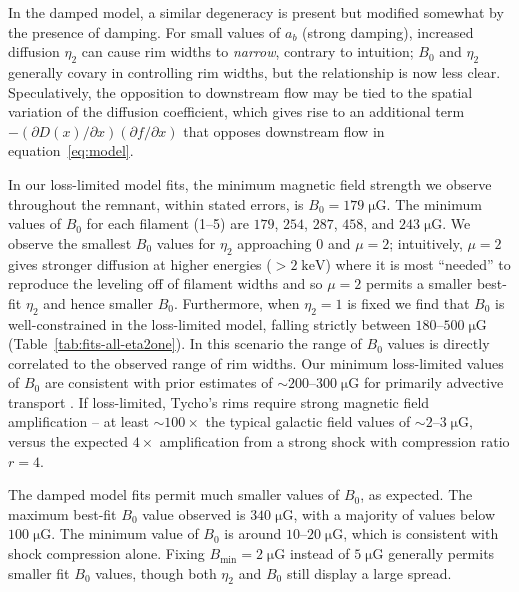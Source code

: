 \documentclass[iop, apj, numberedappendix]{emulateapj}
\newcommand*{\mt}{\mathrm}
\newcommand*{\unit}[1]{\;\mt{#1}}  %
\newcommand*{\abt}{\mathord{\sim}} %
\newcommand*{\ptl}{\partial}
\newcommand*{\Bmin}{B_{\mt{min}}}
\newcommand*{\muG}{\unit{\mu G}}
\begin{document}
In the damped model, a similar degeneracy is present but modified somewhat by
the presence of damping.  For small values of $a_b$ (strong damping), increased
diffusion $\eta_2$ can cause rim widths to \emph{narrow}, contrary to
intuition; $B_0$ and $\eta_2$ generally covary in controlling rim widths, but
the relationship is now less clear.  Speculatively, the opposition to
downstream flow may be tied to the spatial variation of the diffusion
coefficient, which gives rise to an additional term $-(\ptl D(x) / \ptl x)
(\ptl f/\ptl x)$ that opposes downstream flow in equation~\eqref{eq:model}.


In our loss-limited model fits, the minimum magnetic field strength we observe
throughout the remnant, within stated errors, is $B_0 = 179 \muG$.  The minimum
values of $B_0$ for each filament (1--5) are $179$, $254$, $287$, $458$, and
$243 \muG$.  We observe the smallest $B_0$ values for $\eta_2$ approaching $0$
and $\mu = 2$; intuitively, $\mu = 2$ gives stronger diffusion at higher
energies ($>2\unit{keV}$) where it is most ``needed'' to reproduce the leveling
off of filament widths and so $\mu = 2$ permits a smaller best-fit $\eta_2$ and
hence smaller $B_0$.  Furthermore, when $\eta_2 = 1$ is fixed we find that
$B_0$ is well-constrained in the loss-limited model, falling strictly between
$180$--$500 \muG$ (Table~\ref{tab:fits-all-eta2one}).  In this scenario the
range of $B_0$ values is directly correlated to the observed range of rim
widths.  Our minimum loss-limited values of $B_0$ are consistent with prior
estimates of $\abt 200$--$300 \muG$ for primarily advective transport
\citep{volk2005, parizot2006, morlino2012}.  If loss-limited, Tycho's rims
require strong magnetic field amplification -- at least $\abt 100\times$ the
typical galactic field values of $\abt 2$--$3 \muG$, versus the expected
$4\times$ amplification from a strong shock with compression ratio $r=4$.

The damped model fits permit much smaller values of $B_0$, as expected.
The maximum best-fit $B_0$ value observed is $340 \muG$, with a majority of
values below $100 \muG$.  The minimum value of $B_0$ is around $10$--$20
\muG$, which is consistent with shock compression alone.
Fixing $\Bmin = 2 \muG$ instead of $5 \muG$ generally permits smaller
fit $B_0$ values, though both $\eta_2$ and $B_0$ still display a large spread.
\end{document}
